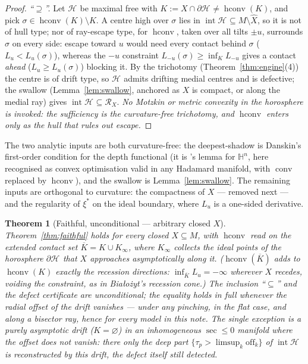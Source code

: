 \documentclass[11pt]{article}
\newtheorem{theorem}{Theorem}[section]
\theoremstyle{remark}
\newcommand{\X}{X}
\newcommand{\Xhat}{\widehat{\X}}
\newcommand{\Rx}{\mathcal{R}_{\X}}
\newcommand{\Hb}[1]{\mathcal{H}_{#1}}
\newcommand{\conv}{\operatorname{conv}}
\newcommand{\hconv}{\operatorname{hconv}}
\newcommand{\HH}{\mathbb{H}}
\begin{document}
\begin{proof}
\emph{``$\supseteq$''.} Let $\Hb{}$ be maximal free with
$K:=X\cap\partial\Hb{}\neq\hconv(K)$, and pick
$\sigma\in\hconv(K)\setminus K$. A centre high over $\sigma$ lies in
$\operatorname{int}\Hb{}\subseteq M\setminus\Xhat$, so it is not of
hull type; nor of ray-escape type, for $\hconv$, taken over all tilts
$\pm u$, surrounds $\sigma$ on every side: escape toward $u$ would need
every contact behind $\sigma$ ($L_{u}<L_{u}(\sigma)$), whereas the
$-u$ constraint $L_{-u}(\sigma)\ge\inf_{K}L_{-u}$ gives a contact
\emph{ahead} ($L_{u}\ge L_{u}(\sigma)$) blocking it. By the trichotomy
(Theorem~\ref{thm:engine}(4)) the centre is of drift type, so $\Hb{}$
admits drifting medial centres and is defective; the swallow
(Lemma~\ref{lem:swallow}, anchored as $X$ is compact, or along the
medial ray) gives $\operatorname{int}\Hb{}\subseteq\Rx$. \emph{No
Motzkin or metric convexity in the horosphere is invoked: the
sufficiency is the curvature-free trichotomy, and $\hconv$ enters only
as the hull that rules out escape.}
\end{proof}

The two analytic inputs are both curvature-free: the deepest-shadow is
Danskin's first-order condition for the depth functional (it is
\cite{R2}'s lemma for $\HH^{n}$, here recognised as convex
optimisation valid in any Hadamard manifold, with $\conv$ replaced by
$\hconv$), and the swallow is Lemma~\ref{lem:swallow}. The remaining
inputs are orthogonal to curvature: the compactness of $X$ --- removed
next --- and the regularity of $\xi^{\ast}$ on the ideal boundary,
where $L_{u}$ is a one-sided derivative.

\begin{theorem}[Faithful, unconditional --- arbitrary closed $X$]
\label{thm:faithful-nc}
Theorem~\ref{thm:faithful} holds for \emph{every} closed $X\subseteq M$,
with $\hconv$ read on the extended contact set
$\overline{K}=K\cup K_{\infty}$, where $K_{\infty}$ collects the ideal
points of the horosphere $\partial\Hb{}$ that $X$ approaches
asymptotically along it. ($\hconv(\overline{K})$ adds to $\hconv(K)$
exactly the recession directions: $\inf_{\overline K}L_{u}=-\infty$
wherever $X$ recedes, voiding the constraint, as in Bia\l{}o\.zyt's
recession cone.) The inclusion ``$\subseteq$'' and the defect
certificate are unconditional; the equality holds in full whenever the
radial offset of the drift vanishes --- under any pinching, in the
flat case, and along a bisector ray, hence for every model in this
note. The single exception is a purely asymptotic drift
($K=\varnothing$) in an \emph{inhomogeneous} $\sec\le0$ manifold where
the offset does not vanish: there only the deep part
$\{\tau_{p}>\limsup_{k}\mathrm{off}_{k}\}$ of $\operatorname{int}\Hb{}$
is reconstructed by this drift, the defect itself still detected.
\end{theorem}
\end{document}
